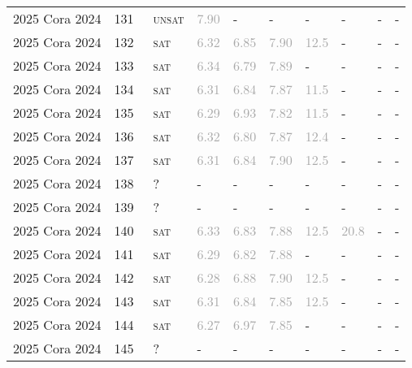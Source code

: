 \begin{center}
{\begin{longtable}{@{}llllllllll@{}}
2025 Cora 2024 & 131 & ~\textsc{unsat} & \textcolor{darkgray}{7.90} & - & - & - & - & - & - \\
2025 Cora 2024 & 132 & ~\textsc{sat} & \textcolor{darkgray}{6.32} & \textcolor{darkgray}{6.85} & \textcolor{darkgray}{7.90} & \textcolor{darkgray}{12.5} & - & - & - \\
2025 Cora 2024 & 133 & ~\textsc{sat} & \textcolor{darkgray}{6.34} & \textcolor{darkgray}{6.79} & \textcolor{darkgray}{7.89} & - & - & - & - \\
2025 Cora 2024 & 134 & ~\textsc{sat} & \textcolor{darkgray}{6.31} & \textcolor{darkgray}{6.84} & \textcolor{darkgray}{7.87} & \textcolor{darkgray}{11.5} & - & - & - \\
2025 Cora 2024 & 135 & ~\textsc{sat} & \textcolor{darkgray}{6.29} & \textcolor{darkgray}{6.93} & \textcolor{darkgray}{7.82} & \textcolor{darkgray}{11.5} & - & - & - \\
2025 Cora 2024 & 136 & ~\textsc{sat} & \textcolor{darkgray}{6.32} & \textcolor{darkgray}{6.80} & \textcolor{darkgray}{7.87} & \textcolor{darkgray}{12.4} & - & - & - \\
2025 Cora 2024 & 137 & ~\textsc{sat} & \textcolor{darkgray}{6.31} & \textcolor{darkgray}{6.84} & \textcolor{darkgray}{7.90} & \textcolor{darkgray}{12.5} & - & - & - \\
2025 Cora 2024 & 138 & ~? & - & - & - & - & - & - & - \\
2025 Cora 2024 & 139 & ~? & - & - & - & - & - & - & - \\
2025 Cora 2024 & 140 & ~\textsc{sat} & \textcolor{darkgray}{6.33} & \textcolor{darkgray}{6.83} & \textcolor{darkgray}{7.88} & \textcolor{darkgray}{12.5} & \textcolor{darkgray}{20.8} & - & - \\
2025 Cora 2024 & 141 & ~\textsc{sat} & \textcolor{darkgray}{6.29} & \textcolor{darkgray}{6.82} & \textcolor{darkgray}{7.88} & - & - & - & - \\
2025 Cora 2024 & 142 & ~\textsc{sat} & \textcolor{darkgray}{6.28} & \textcolor{darkgray}{6.88} & \textcolor{darkgray}{7.90} & \textcolor{darkgray}{12.5} & - & - & - \\
2025 Cora 2024 & 143 & ~\textsc{sat} & \textcolor{darkgray}{6.31} & \textcolor{darkgray}{6.84} & \textcolor{darkgray}{7.85} & \textcolor{darkgray}{12.5} & - & - & - \\
2025 Cora 2024 & 144 & ~\textsc{sat} & \textcolor{darkgray}{6.27} & \textcolor{darkgray}{6.97} & \textcolor{darkgray}{7.85} & - & - & - & - \\
2025 Cora 2024 & 145 & ~? & - & - & - & - & - & - & - \\

\end{longtable}}
\end{center}
